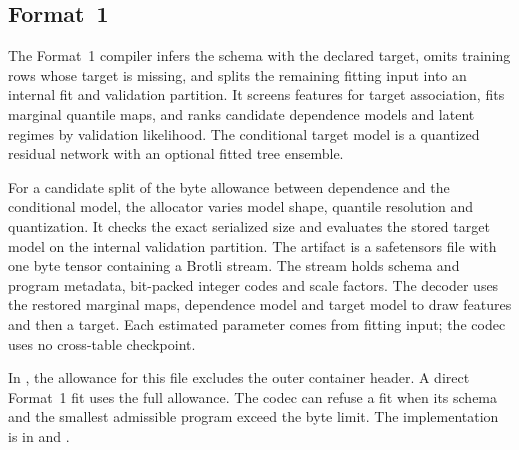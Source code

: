 \subsection{Format~1}
The Format~1 compiler infers the schema with the declared target, omits training rows whose target is missing, and splits the remaining fitting input into an internal fit and validation partition. It screens features for target association, fits marginal quantile maps, and ranks candidate dependence models and latent regimes by validation likelihood. The conditional target model is a quantized residual network with an optional fitted tree ensemble.

For a candidate split of the byte allowance between dependence and the conditional model, the allocator varies model shape, quantile resolution and quantization. It checks the exact serialized size and evaluates the stored target model on the internal validation partition. The artifact is a safetensors file with one byte tensor containing a Brotli stream. The stream holds schema and program metadata, bit-packed integer codes and scale factors. The decoder uses the restored marginal maps, dependence model and target model to draw features and then a target. Each estimated parameter comes from fitting input; the codec uses no cross-table checkpoint.

In , the allowance for this file excludes the outer container header. A direct Format~1 fit uses the full allowance. The codec can refuse a fit when its schema and the smallest admissible program exceed the byte limit. The implementation is in  and .
